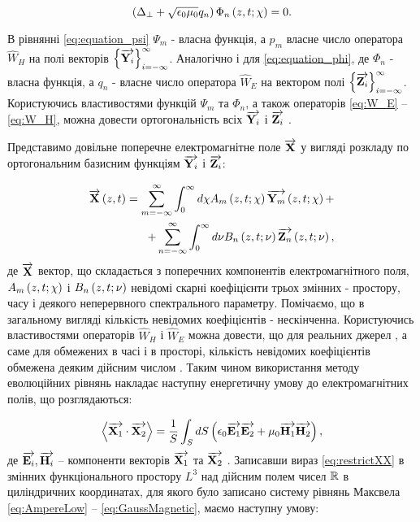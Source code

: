 \begin{equation} \label{eq:equation_phi}
\left( \Delta_\perp + \sqrt{\epsilon_0 \mu_0} q_n \right)
\Phi_n \left( z,t;\chi \right) = 0.
\end{equation}

В рівнянні \eqref{eq:equation_psi} $ \Psi_m $ - власна функція, а $ p_m $ 
власне число оператора $ \widehat{W}_H $ на полі векторів 
$ \left\{ \overrightarrow{\mathbf Y_i} \right\}_{i=-\infty}^\infty $. Аналогічно і для 
\eqref{eq:equation_phi}, де $ \Phi_n $ - власна функція, а $ q_n $ - власне
число оператора $ \widehat{W}_E $ на вектором полі
$ \left\{ \overrightarrow{\mathbf Z_i} \right\}_{i=-\infty}^\infty $. Користуючись 
властивостями функцій $ \Psi_m $ та $ \Phi_n $, а також операторів 
\eqref{eq:W_E} -- \eqref{eq:W_H}, можна довести ортогональність всіх 
$ \overrightarrow{\mathbf Y_i} $ і $ \overrightarrow{\mathbf Z_i} $ \cite{imp:Tretyakov1994}.

Представимо довільне поперечне електромагнітне поле $ \overrightarrow{\mathbf X} $ у вигляді 
розкладу по ортогональним базисним функціям $ \overrightarrow{\mathbf Y_i} $ і $ \overrightarrow{\mathbf Z_i} $:

\begin{equation} \begin{aligned} \label{eq:modalYZ}
\overrightarrow{\mathbf X} \left( z,t \right) = 
\sum_{m=-\infty}^\infty \int_0^\infty d \chi 
A_m \left( z,t;\chi \right) \overrightarrow{\mathbf Y_m} \left( z,t;\chi \right) + \\
+ \sum_{n=-\infty}^\infty \int_0^\infty d \nu 
B_n \left( z,t;\nu \right) \overrightarrow{\mathbf Z_n} \left( z,t;\nu \right),
\end{aligned} \end{equation}
%
де $ \overrightarrow{\mathbf X} $ вектор, що складається з поперечних компонентів 
електромагнітного поля, $ A_m \left( z,t;\chi \right) $ і $ B_n \left( z,t;\nu \right) $ 
невідомі скарні коефіцієнти трьох змінних - простору, часу і деякого 
неперервного спектрального параметру. Помічаємо, що в загальному вигляді 
кількість невідомих коефіцієнтів - нескінченна. Користуючись властивостями 
операторів $ \widehat{W}_H $ і $ \widehat{W}_E $ можна довести, що для 
реальних джерел \cite{imp:Legenkiy2010}, а саме для обмежених в часі і в 
просторі, кількість невідомих коефіцієнтів обмежена деяким дійсним числом
\cite{imp:Tretyakov2004, imp:Tretyakov2010}. Таким чином використання 
методу еволюційних рівнянь накладає наступну енергетичну 
умову до електромагнітних полів, що розглядаються:

\begin{equation} \label{eq:restrictXX}
\left< \overrightarrow{\mathbf X_1} \cdot \overrightarrow{\mathbf X_2} \right> = \frac{1}{S} \int_{S} dS
\left( \epsilon_0 \overrightarrow{\mathbf E_1} \overrightarrow{\mathbf E_2} + \mu_0 \overrightarrow{\mathbf H_1} \overrightarrow{\mathbf H_2} \right),
\end{equation}
%
де $ \overrightarrow{\mathbf E_i}, \overrightarrow{\mathbf H_i} $ -- компоненти векторів $ \overrightarrow{\mathbf X_1} $ та 
$ \overrightarrow{\mathbf X_2} $ . Записавши вираз \eqref{eq:restrictXX} в змінних 
функціонального простору $ L^3 $ над дійсним полем чисел $ \mathbb{R} $ в 
циліндричних координатах, для якого було записано систему рівнянь Максвела 
\eqref{eq:AmpereLow} -- \eqref{eq:GaussMagnetic}, маємо наступну умову:


